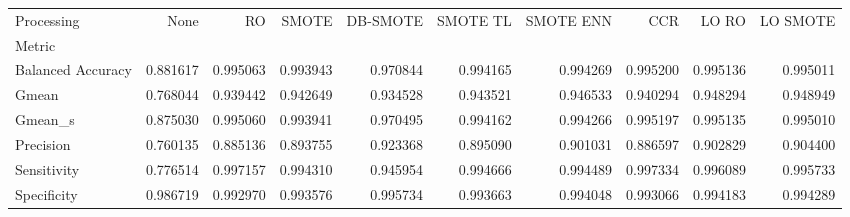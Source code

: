 \begin{tabular}{lrrrrrrrrr}
\toprule
Processing &      None &        RO &     SMOTE &  DB-SMOTE &  SMOTE TL &  SMOTE ENN &       CCR &     LO RO &  LO SMOTE \\
Metric            &           &           &           &           &           &            &           &           &           \\
\midrule
Balanced Accuracy &  0.881617 &  0.995063 &  0.993943 &  0.970844 &  0.994165 &   0.994269 &  0.995200 &  0.995136 &  0.995011 \\
Gmean             &  0.768044 &  0.939442 &  0.942649 &  0.934528 &  0.943521 &   0.946533 &  0.940294 &  0.948294 &  0.948949 \\
Gmean_s           &  0.875030 &  0.995060 &  0.993941 &  0.970495 &  0.994162 &   0.994266 &  0.995197 &  0.995135 &  0.995010 \\
Precision         &  0.760135 &  0.885136 &  0.893755 &  0.923368 &  0.895090 &   0.901031 &  0.886597 &  0.902829 &  0.904400 \\
Sensitivity       &  0.776514 &  0.997157 &  0.994310 &  0.945954 &  0.994666 &   0.994489 &  0.997334 &  0.996089 &  0.995733 \\
Specificity       &  0.986719 &  0.992970 &  0.993576 &  0.995734 &  0.993663 &   0.994048 &  0.993066 &  0.994183 &  0.994289 \\
\bottomrule
\end{tabular}
